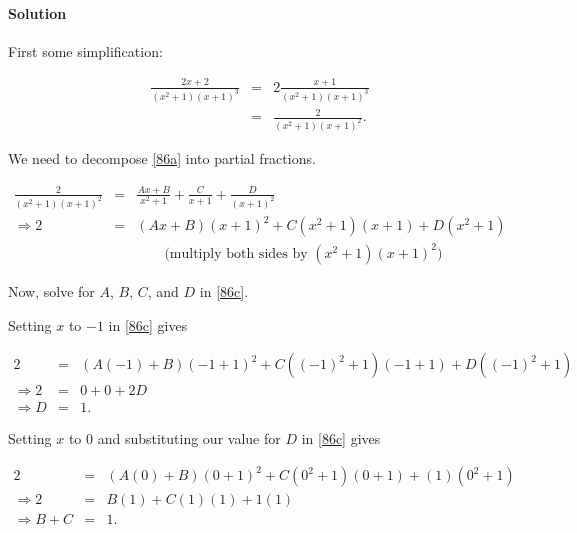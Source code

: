 

\paragraph{Solution}

First some simplification:

\begin{eqnarray}
	\frac{2x+2}{\left(x^2+1\right)\left(x+1\right)^3}&=&2\frac{x+1}{\left(x^2+1\right)\left(x+1\right)^3}\nonumber\\
	&=&\frac{2}{\left(x^2+1\right)\left(x+1\right)^2}.\label{86a}
\end{eqnarray}

We need to decompose \ref{86a} into partial fractions.

\begin{eqnarray}
	\frac{2}{\left(x^2+1\right)\left(x+1\right)^2}&=&\frac{Ax+B}{x^2+1}+\frac{C}{x+1}+\frac{D}{\left(x+1\right)^2}\label{86b}\\
	\Rightarrow2&=&\left(Ax+B\right)\left(x+1\right)^2+C\left(x^2+1\right)\left(x+1\right)+D\left(x^2+1\right)\label{86c}\\
    &&\qquad\mbox{(multiply both sides by }\left(x^2+1\right)\left(x+1\right)^2\mbox{)}\nonumber
\end{eqnarray}

Now, solve for $A$, $B$, $C$, and $D$ in \ref{86c}.

Setting $x$ to $-1$ in \ref{86c} gives

\begin{eqnarray*}
    2&=&\left(A\left(-1\right)+B\right)\left(-1+1\right)^2+C\left(\left(-1\right)^2+1\right)\left(-1+1\right)+D\left(\left(-1\right)^2+1\right)\\
    \Rightarrow2&=&0+0+2D\\
    \Rightarrow D&=&1.
\end{eqnarray*}

Setting $x$ to $0$ and substituting our value for $D$ in \ref{86c} gives

\begin{eqnarray}
	2&=&\left(A\left(0\right)+B\right)\left(0+1\right)^2+C\left(0^2+1\right)\left(0+1\right)+\left(1\right)\left(0^2+1\right)\nonumber\\
    \Rightarrow2&=&B\left(1\right)+C\left(1\right)\left(1\right)+1\left(1\right)\nonumber\\
    \Rightarrow B+C&=&1.\label{86d}
\end{eqnarray}

